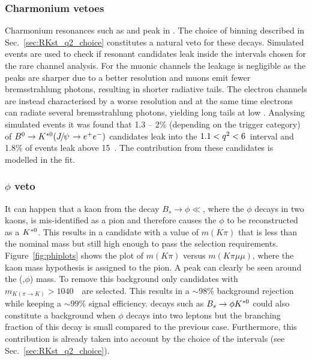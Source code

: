 \subsubsection{Charmonium vetoes}

Charmonium resonances such as \jpsi and \psitwos peak in \qsq.
The choice of \qsq binning described in Sec.~\ref{sec:RKst_q2_choice}
constitutes a natural veto for these decays. Simulated events are used
to check if resonant candidates leak inside the \qsq intervals chosen for
the rare channel analysis. For the muonic channels the leakage is negligible
as the peaks are sharper due to a better resolution and muons emit fewer
bremsstrahlung photons, resulting in shorter radiative tails.
The electron channels are instead characterised by
a worse resolution and at the same time electrons can radiate 
several bremsstrahlung photons, yielding long tails at low \qsq.
Analysing simulated events it was found that 1.3 -- 2\% (depending on
the trigger category) of \mbox{$\Bz\to\Kstarz(\jpsi\to\ee)$} candidates leak into the 
$1.1 < {q^2} < 6$~\gevgevcccc interval and 1.8\% of \psitwos events leak above 
15~\gevgevcccc. The contribution from these candidates is modelled in the fit. 


\subsubsection{$\phi$ veto}

It can happen that a kaon from the decay $B_s \rightarrow \phi \ll$, where the $\phi$ decays in two kaons,
is mis-identified as a pion and therefore causes the $\phi$ to be reconstructed as a ${{K}^{*0}}$. This results in
a candidate with a value of $m(K\pi)$ that is less than the nominal \Kstarz mass but still high enough to
pass the selection requirements. Figure~\ref{fig:phiplots} shows the plot of $m(K\pi)$ versus
$m(K\pi \mu\mu)$, where the kaon mass hypothesis is assigned to the pion. A peak can clearly be seen
around the (\Bs,$\phi$) mass.
To remove this background only candidates with $m_{K(\pi\rightarrow K)} > 1040$~\mevcc~are selected.
This results in a $\sim98\%$ background rejection while keeping a $\sim99\%$ signal efficiency.
\Bs decays such as $B_s \rightarrow \phi {\ensuremath{{K}^{*0}}}$ could also constitute a background when $\phi$ decays into two leptons 
but the branching fraction of this decay is small compared to the previous case.
Furthermore, this contribution is already taken into account by the choice of the \qsq intervals (see Sec.~\ref{sec:RKst_q2_choice}).

